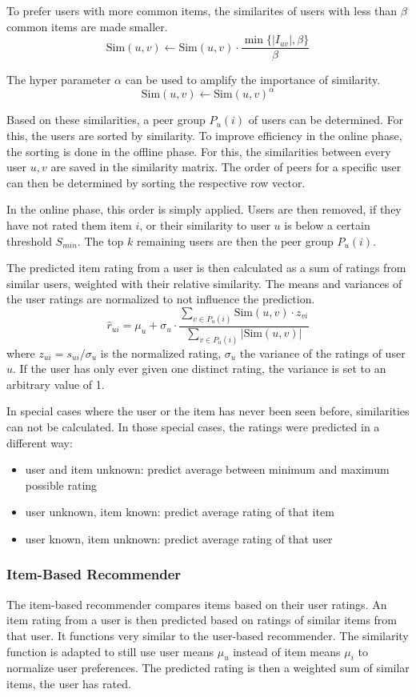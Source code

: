 \documentclass[12pt]{scrartcl}
\newcommand{\set}[1]{\{#1\}}
\newcommand{\abs}[1]{\left\vert #1 \right\vert}
\begin{document}
To prefer users with more common items, the similarites of users with less than $\beta$ common items are made smaller.
$$\text{Sim}(u, v) \gets \text{Sim}(u, v) \cdot \frac{\min\set{\abs{I_{uv}}, \beta}}{\beta}$$

The hyper parameter $\alpha$ can be used to amplify the importance of similarity.
$$\text{Sim}(u, v) \gets \text{Sim}(u, v)^\alpha$$

Based on these similarities, a peer group $P_u(i)$ of users can be determined. For this, the users are sorted by similarity.
To improve efficiency in the online phase, the sorting is done in the offline phase.
For this, the similarities between every user $u, v$ are saved in the similarity matrix.
The order of peers for a specific user can then be determined by sorting the respective row vector.

In the online phase, this order is simply applied. Users are then removed, if they have not rated them item $i$, or their similarity to user $u$ is below a certain threshold $S_{min}$.
The top $k$ remaining users are then the peer group $P_u(i)$.

The predicted item rating from a user is then calculated as a sum of ratings from similar users, weighted with their relative similarity.
The means and variances of the user ratings are normalized to not influence the prediction.
$$\hat{r}_{ui} = \mu_u + \sigma_u \cdot \frac{\sum\limits_{v \in P_u(i)} \text{Sim}(u, v) \cdot z_{vi}}{\sum\limits_{v \in P_u(i)} \abs{\text{Sim}(u, v)}}$$
where $z_{ui} = s_{ui} / \sigma_u$ is the normalized rating, $\sigma_u$ the variance of the ratings of user $u$.
If the user has only ever given one distinct rating, the variance is set to an arbitrary value of 1.

\hypertarget{special_cases}{}
In special cases where the user or the item has never been seen before, similarities can not be calculated. In those special cases, the ratings were predicted in a different way:

\begin{itemize}
	\item user and item unknown: predict average between minimum and maximum possible rating
	\item user unknown, item known: predict average rating of that item
	\item user known, item unknown: predict average rating of that user
\end{itemize}

\subsubsection[Item-Based]{Item-Based Recommender}
The item-based recommender compares items based on their user ratings. An item rating from a user is then predicted based on ratings of similar items from that user.
It functions very similar to the user-based recommender. The similarity function is adapted to still use user means $\mu_u$ instead of item means $\mu_i$ to normalize user preferences.
The predicted rating is then a weighted sum of similar items, the user has rated.
\end{document}
